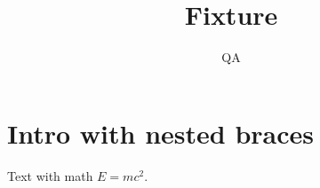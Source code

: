\documentclass{article}
\title{Fixture}
\author{QA}
\begin{document}
\maketitle
\tableofcontents
\section{Intro with \textbf{nested {braces}}}
Text with math $E = mc^2$.

% 
\end{document}
